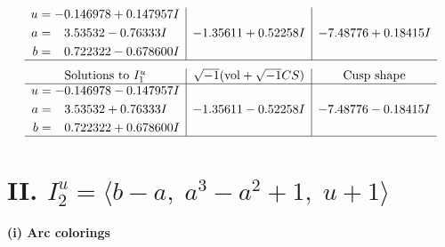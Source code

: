 \documentclass[1p]{elsarticle_modified}
\theoremstyle{definition}
\newcommand{\I}{\sqrt{-1}}
\begin{document}
$$\begin{array}{c|c|c}
\begin{aligned}
u &= -0.146978 + 0.147957 I \\
a &= \phantom{-}3.53532 - 0.76333 I \\
b &= \phantom{-}0.722322 - 0.678600 I\end{aligned}
 & -1.35611 + 0.52258 I & -7.48776 + 0.18415 I\\
 \hline 
 \end{array}$$\newpage$$\begin{array}{c|c|c}  
\text{Solutions to }I^u_{1}& \I (\text{vol} + \sqrt{-1}CS) & \text{Cusp shape}\\
 \hline 
\begin{aligned}
u &= -0.146978 - 0.147957 I \\
a &= \phantom{-}3.53532 + 0.76333 I \\
b &= \phantom{-}0.722322 + 0.678600 I\end{aligned}
 & -1.35611 - 0.52258 I & -7.48776 - 0.18415 I\\
 \hline 
 \end{array}$$\newpage\newpage\renewcommand{\arraystretch}{1}
\centering \section*{II. $I^u_{2}= \langle b- a,\;a^3- a^2+1,\;u+1 \rangle$}
\flushleft \textbf{(i) Arc colorings}\\
\end{document}
